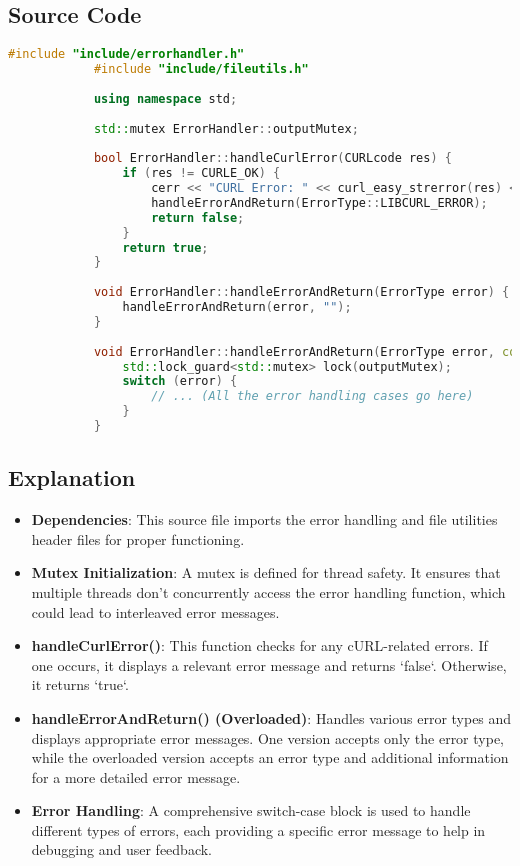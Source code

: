 \documentclass{article}
\begin{document}
	\subsection*{Source Code}
	\begin{mdframed}[backgroundcolor=background, hidealllines=false, innerleftmargin=15pt, innerrightmargin=5pt, innertopmargin=0pt, innerbottommargin=-5pt]
		\begin{lstlisting}[language=C++]
			#include "include/errorhandler.h"
			#include "include/fileutils.h"
			
			using namespace std;
			
			std::mutex ErrorHandler::outputMutex;
			
			bool ErrorHandler::handleCurlError(CURLcode res) {
				if (res != CURLE_OK) {
					cerr << "CURL Error: " << curl_easy_strerror(res) << endl;
					handleErrorAndReturn(ErrorType::LIBCURL_ERROR);
					return false;
				}
				return true;
			}
			
			void ErrorHandler::handleErrorAndReturn(ErrorType error) {
				handleErrorAndReturn(error, "");
			}
			
			void ErrorHandler::handleErrorAndReturn(ErrorType error, const string& extraInfo) {
				std::lock_guard<std::mutex> lock(outputMutex);
				switch (error) {
					// ... (All the error handling cases go here)
				}
			}
		\end{lstlisting}
	\end{mdframed}
	
	\subsection*{Explanation}
	\begin{itemize}
		\item \textbf{Dependencies}: This source file imports the error handling and file utilities header files for proper functioning.
		
		\item \textbf{Mutex Initialization}: A mutex is defined for thread safety. It ensures that multiple threads don't concurrently access the error handling function, which could lead to interleaved error messages.
		
		\item \textbf{handleCurlError()}: This function checks for any cURL-related errors. If one occurs, it displays a relevant error message and returns `false`. Otherwise, it returns `true`.
		
		\item \textbf{handleErrorAndReturn() (Overloaded)}: Handles various error types and displays appropriate error messages. One version accepts only the error type, while the overloaded version accepts an error type and additional information for a more detailed error message.
		
		\item \textbf{Error Handling}: A comprehensive switch-case block is used to handle different types of errors, each providing a specific error message to help in debugging and user feedback.
	\end{itemize}
		
\end{document}
